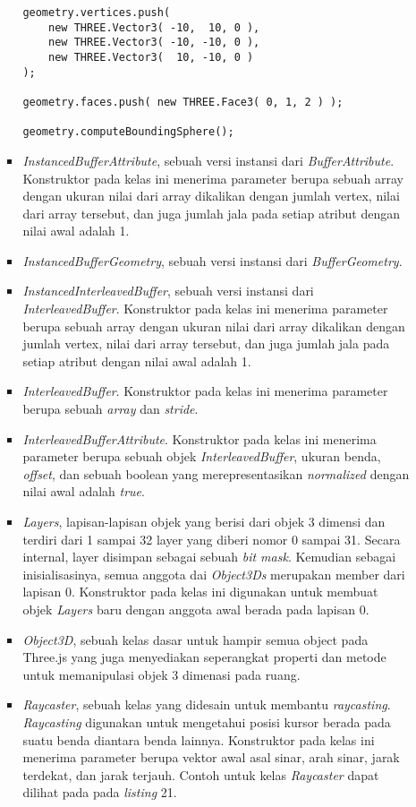 \documentclass[a4paper,twoside]{article}
\begin{document}
\begin{enumerate}
\begin{itemize}
\begin{itemize}
\begin{lstlisting}[caption={Contoh instansiasi kelas {\it Geometry}.},captionpos=b]
geometry.vertices.push(
	new THREE.Vector3( -10,  10, 0 ),
	new THREE.Vector3( -10, -10, 0 ),
	new THREE.Vector3(  10, -10, 0 )
);

geometry.faces.push( new THREE.Face3( 0, 1, 2 ) );

geometry.computeBoundingSphere();
\end{lstlisting}

	\item{\it InstancedBufferAttribute}, sebuah versi instansi dari {\it BufferAttribute}. Konstruktor pada kelas ini menerima parameter berupa sebuah array dengan ukuran nilai dari array dikalikan dengan jumlah vertex, nilai dari array tersebut, dan juga jumlah jala pada setiap atribut dengan nilai awal adalah 1.
	
	\item{\it InstancedBufferGeometry}, sebuah versi instansi dari {\it BufferGeometry}.
	
	\item{\it InstancedInterleavedBuffer}, sebuah versi instansi dari {\it InterleavedBuffer}. Konstruktor pada kelas ini menerima parameter berupa sebuah array dengan ukuran nilai dari array dikalikan dengan jumlah vertex, nilai dari array tersebut, dan juga jumlah jala pada setiap atribut dengan nilai awal adalah 1.
	
	\item{\it InterleavedBuffer}. Konstruktor pada kelas ini menerima parameter berupa sebuah {\it array} dan {\it stride}.
	
	\item{\it InterleavedBufferAttribute}. Konstruktor pada kelas ini menerima parameter berupa sebuah objek {\it InterleavedBuffer}, ukuran benda, {\it offset}, dan sebuah boolean yang merepresentasikan {\it normalized} dengan nilai awal adalah {\it true}.
	
	\item{\it Layers}, lapisan-lapisan objek yang berisi dari objek 3 dimensi dan terdiri dari 1 sampai 32 layer yang diberi nomor 0 sampai 31. Secara internal, layer disimpan sebagai sebuah {\it bit mask}. Kemudian sebagai inisialisasinya, semua anggota dai {\it Object3Ds} merupakan member dari lapisan 0. Konstruktor pada kelas ini digunakan untuk membuat objek {\it Layers} baru dengan anggota awal berada pada lapisan 0.
	\item{\it Object3D}, sebuah kelas dasar untuk hampir semua object pada Three.js yang juga menyediakan seperangkat properti dan metode untuk memanipulasi objek 3 dimenasi pada ruang.
	\item{\it Raycaster}, sebuah kelas yang didesain untuk membantu {\it raycasting}. {\it Raycasting} digunakan untuk mengetahui posisi kursor berada pada suatu benda diantara benda lainnya. Konstruktor pada kelas ini menerima parameter berupa vektor awal asal sinar, arah sinar, jarak terdekat, dan jarak terjauh. Contoh untuk kelas {\it Raycaster} dapat dilihat pada pada {\it listing} 21.
	

\end{itemize}
\end{itemize}
\end{enumerate}
\end{document}
